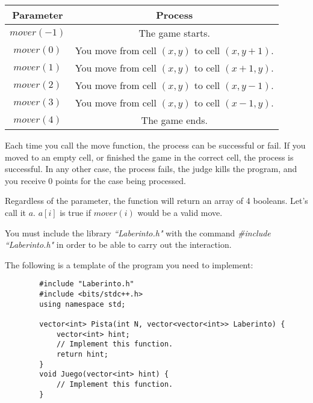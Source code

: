 \documentclass[12pt]{scrartcl}
\begin{document}
    \begin{center}
        \begin{tabular}{|c|c|}
            \hline
            {\bfseries Parameter} & {\bfseries Process}\\
            \hline
             $mover(-1)$ & The game starts. \\
             \hline
             $mover(0)$ &  You move from cell $(x, y)$ to cell $(x, y + 1)$. \\
             \hline
             $mover(1)$ & You move from cell $(x, y)$ to cell $(x + 1, y)$.\\
             \hline
             $mover(2)$ & You move from cell $(x, y)$ to cell $(x, y - 1)$.\\
             \hline
             $mover(3)$ & You move from cell $(x, y)$ to cell $(x - 1, y)$.\\
             \hline
             $mover(4)$ & The game ends.\\
             \hline
        \end{tabular}
    \end{center}

    Each time you call the move function, the process can be successful or fail. If you moved to an empty cell, or finished the game in the correct cell, the process is successful. In any other case, the process fails, the judge kills the program, and you receive 0 points for the case being processed.
    
    Regardless of the parameter, the function will return an array of 4 booleans. Let's call it $a$. $a[i]$ is true if $mover(i)$ would be a valid move.

    You must include the library \textit{``Laberinto.h"} with the command \textit{\#include ``Laberinto.h"} in order to be able to carry out the interaction.
    
    The following is a template of the program you need to implement:
    
    \begin{verbatim}
        #include "Laberinto.h"
        #include <bits/stdc++.h>
        using namespace std;
        
        vector<int> Pista(int N, vector<vector<int>> Laberinto) {
            vector<int> hint;
            // Implement this function.
            return hint;
        }
        void Juego(vector<int> hint) {
            // Implement this function.
        }
        
    \end{verbatim}
\end{document}
